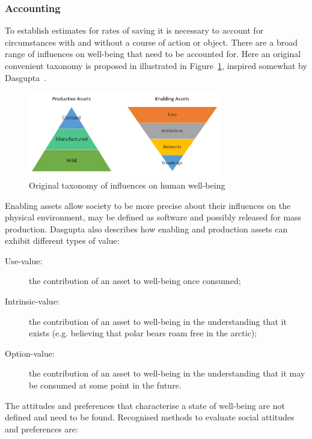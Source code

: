\documentclass[11pt, oneside]{article}   	%
\begin{document}
\subsubsection{Accounting}

To establish estimates for rates of saving it is necessary to account for circumstances with and without a course of action or object. There are a broad range of influences on well-being that need to be accounted for. Here an original convenient taxonomy is proposed in illustrated in Figure~\ref{Influences on well-being figure}, inspired somewhat by Dasgupta~\cite{pd3}.

\begin{figure}[h]
\begin{center}
\includegraphics[width=0.75\textwidth]{productiveAssetTaxonomy.png}
\caption{Original taxonomy of influences on human well-being}
\label{Influences on well-being figure}
\end{center}
\end{figure}

Enabling assets allow society to be more precise about their influences on the physical environment, may be defined as software and possibly released for mass production. Dasgupta\cite{pd2} also describes how enabling and production assets can exhibit different types of value:

\begin{description}
\item[Use-value:] the contribution of an asset to well-being once consumed;
\item[Intrinsic-value:] the contribution of an asset to well-being in the understanding that it exists (e.g. believing that polar bears roam free in the arctic);
\item[Option-value:] the contribution of an asset to well-being in the understanding that it may be consumed at some point in the future.
\end{description}

The attitudes and preferences that characterise a state of well-being are not defined and need to be found. Recognised methods to evaluate social attitudes and preferences are:
\end{document}
